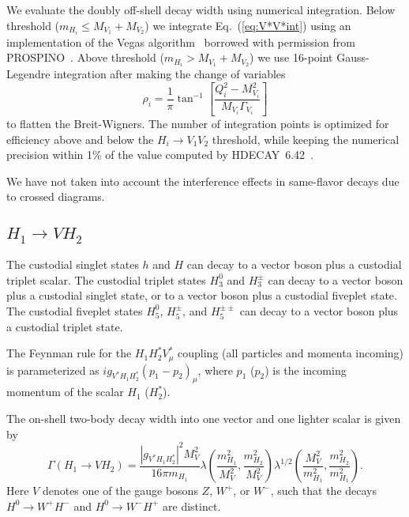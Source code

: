 \documentclass[11pt]{article}
\begin{document}
We evaluate the doubly off-shell decay width using numerical integration.  Below threshold ($m_{H_i} \leq M_{V_1} + M_{V_2}$) we integrate Eq.~(\ref{eq:V*V*int}) using an implementation of the Vegas algorithm~\cite{Lepage:1980dq} borrowed with permission from PROSPINO~\cite{Beenakker:1996ed}.  Above threshold ($m_{H_i} > M_{V_1} + M_{V_2}$) we use 16-point Gauss-Legendre integration
after making the change of variables 
\begin{equation}
	\rho_i = \frac{1}{\pi} \tan^{-1}\left[ \frac{Q_i^2 - M_{V_i}^2}{M_{V_i} \Gamma_{V_i}} \right]
\end{equation}
to flatten the Breit-Wigners.  The number of integration points is optimized for efficiency above and below the $H_i \to V_1 V_2$ threshold, while keeping the numerical precision within 1\% of the value computed by HDECAY~6.42~\cite{Djouadi:1997yw}.

We have not taken into account the interference effects in same-flavor decays due to crossed diagrams.



\subsection{$H_1 \to V H_2$}

The custodial singlet states $h$ and $H$ can decay to a vector boson plus a custodial triplet scalar.  The custodial triplet states $H_3^0$ and $H_3^{\pm}$ can decay to a vector boson plus a custodial singlet state, or to a vector boson plus a custodial fiveplet state.  The custodial fiveplet states $H_5^0$, $H_5^{\pm}$, and $H_5^{\pm \pm}$ can decay to a vector boson plus a custodial triplet state.  

The Feynman rule for the $H_1 H_2^* V^*_{\mu}$ coupling (all particles and momenta incoming) is parameterized as $i g_{V^*H_1H_2^*} (p_1 - p_2)_{\mu}$, where $p_1$ ($p_2$) is the incoming momentum of the scalar $H_1$ ($H_2^*$).

The on-shell two-body decay width into one vector and one lighter scalar is given by
\begin{equation}
	\Gamma(H_1 \to V H_2) = \frac{|g_{V^*H_1H_2^*}|^2 M_V^2}{16 \pi m_{H_1}}
	\lambda\left( \frac{m_{H_1}^2}{M_V^2}, \frac{m_{H_2}^2}{M_V^2} \right)
	\lambda^{1/2} \left( \frac{M_V^2}{m_{H_1}^2}, \frac{m_{H_2}^2}{m_{H_1}^2} \right).
\end{equation}
Here $V$ denotes one of the gauge bosons $Z$, $W^+$, or $W^-$, such that the decays $H^0 \to W^+ H^-$ and $H^0 \to W^- H^+$ are distinct.
\end{document}
